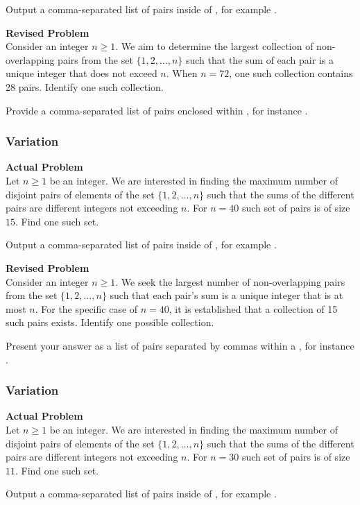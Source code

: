 Output a comma-separated list of pairs inside of \boxed, for example .

\textbf{Revised Problem}\\
Consider an integer \( n \geq 1\). We aim to determine the largest collection of non-overlapping pairs from the set \(\{1, 2, \ldots, n\}\) such that the sum of each pair is a unique integer that does not exceed \(n\). When \(n=72\), one such collection contains 28 pairs. Identify one such collection.

Provide a comma-separated list of pairs enclosed within \boxed, for instance .

\subsubsection{Variation}
\textbf{Actual Problem}\\
Let $n \geq 1$ be an integer. We are interested in finding the maximum number of disjoint pairs of elements of the
set $\{1, 2, \ldots, n\}$ such that the sums of the different pairs are different integers not exceeding $n$. 
For $n=40$ such set of pairs is of size $15$. Find one such set.

Output a comma-separated list of pairs inside of \boxed, for example .

\textbf{Revised Problem}\\
Consider an integer $n \geq 1$. We seek the largest number of non-overlapping pairs from the set $\{1, 2, \ldots, n\}$ such that each pair's sum is a unique integer that is at most $n$. For the specific case of $n = 40$, it is established that a collection of 15 such pairs exists. Identify one possible collection.

Present your answer as a list of pairs separated by commas within a \boxed, for instance .

\subsubsection{Variation}
\textbf{Actual Problem}\\
Let $n \geq 1$ be an integer. We are interested in finding the maximum number of disjoint pairs of elements of the
set $\{1, 2, \ldots, n\}$ such that the sums of the different pairs are different integers not exceeding $n$. 
For $n=30$ such set of pairs is of size $11$. Find one such set.

Output a comma-separated list of pairs inside of \boxed, for example .

